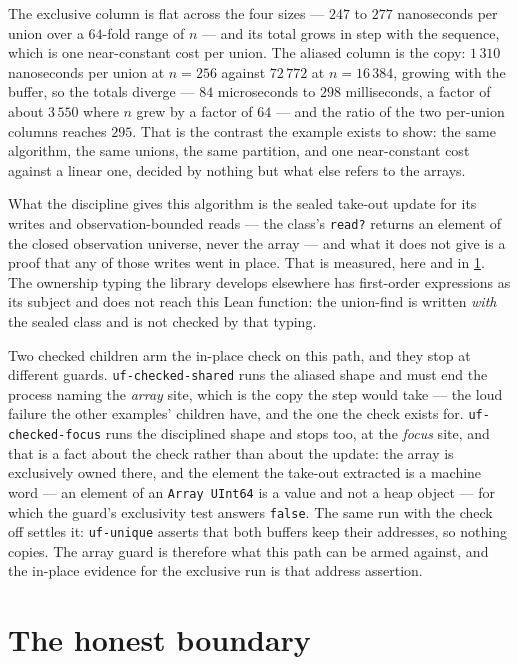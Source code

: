 \documentclass[11pt,a4paper]{article}
\theoremstyle{definition}
\newcommand{\code}[1]{\texttt{#1}}
\begin{document}
The exclusive column is flat across the four sizes --- $247$ to $277$ nanoseconds
per union over a $64$-fold range of $n$ --- and its total grows in step with the
sequence, which is one near-constant cost per union. The aliased column is the
copy: $1\,310$ nanoseconds per union at $n = 256$ against $72\,772$ at
$n = 16\,384$, growing with the buffer, so the totals diverge --- $84$ microseconds
to $298$ milliseconds, a factor of about $3\,550$ where $n$ grew by a factor of
$64$ --- and the ratio of the two per-union columns reaches $295$. That is the
contrast the example exists to show: the same algorithm, the same unions, the same
partition, and one near-constant cost against a linear one, decided by nothing but
what else refers to the arrays.

What the discipline gives this algorithm is the sealed take-out update for its
writes and observation-bounded reads --- the class's \code{read?} returns an
element of the closed observation universe, never the array --- and what it does
not give is a proof that any of those writes went in place. That is measured, here
and in \cref{sec:boundary}. The ownership typing the library develops elsewhere
has first-order expressions as its subject and does not reach this Lean function:
the union-find is written \emph{with} the sealed class and is not checked by that
typing.

Two checked children arm the in-place check on this path, and they stop at
different guards. \code{uf-checked-shared} runs the aliased shape and must end the
process naming the \emph{array} site, which is the copy the step would take --- the
loud failure the other examples' children have, and the one the check exists for.
\code{uf-checked-focus} runs the disciplined shape and stops too, at the
\emph{focus} site, and that is a fact about the check rather than about the
update: the array is exclusively owned there, and the element the take-out
extracted is a machine word --- an element of an \code{Array UInt64} is a value and
not a heap object --- for which the guard's exclusivity test answers \code{false}.
The same run with the check off settles it: \code{uf-unique} asserts that both
buffers keep their addresses, so nothing copies. The array guard is therefore what
this path can be armed against, and the in-place evidence for the exclusive run is
that address assertion.

\section{The honest boundary}\label{sec:boundary}
\end{document}
